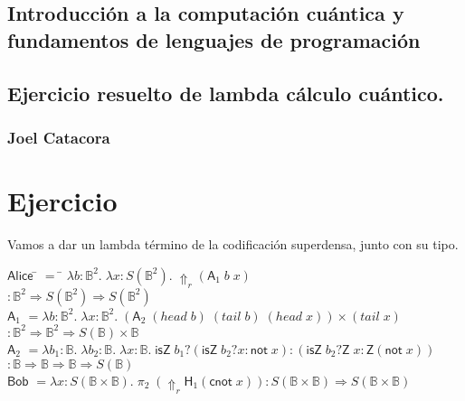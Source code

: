 \documentclass[a4paper,11pt]{article}
\title{}
\author{}
\begin{document}
\maketitle 

\thispagestyle{empty}
\begin{center}
\section*{Introducción a  la computación cuántica y fundamentos de lenguajes de programación} 
\subsection*{Ejercicio resuelto de lambda cálculo cuántico.}
\subsubsection*{Joel Catacora}

\end{center}

\newpage{\pagestyle{empty}\cleardoublepage}

\newpage

\section*
{Ejercicio}

Vamos a dar un lambda término de la codificación superdensa, junto con su tipo.

\begin{tabbing}
  $\textsf{Alice}$ \= $=$ \= $\lambda b : \mathds{B}^2. \; \lambda x : S(\mathds{B}^2). 
  \; \Uparrow_r (\textsf{A}_1 \; b \; x)$ \\
  
  \> \> $: \mathds{B}^2 \Rightarrow S(\mathds{B}^2) \Rightarrow S(\mathds{B}^2)$ \\

  $\textsf{A}_1$ \> $= \lambda b : \mathds{B}^2 . \; \lambda x : \mathds{B}^2. \; ( \textsf{A}_2 \; (head \; b) \; (tail \; b) \; (head \; x)) 
  \times (tail \; x)$ \\
  \> \> $: \mathds{B}^2 \Rightarrow \mathds{B}^2 \Rightarrow S(\mathds{B}) \times \mathds{B}$ \\
  
  $\textsf{A}_2$ \> $= \lambda b_1:\mathds{B}. \; \lambda b_2:\mathds{B}. \; \lambda x : \mathds{B}. \;
  \textsf{isZ} \; b_1 ? (\textsf{isZ} \; b_2 ? x : \textsf{not} \; x) : 
  (\textsf{isZ} \; b_2 ? \textsf{Z} \; x : \textsf{Z} (\textsf{not} \; x))$ \\
  \> \> $: \mathds{B} \Rightarrow \mathds{B} \Rightarrow \mathds{B} \Rightarrow S(\mathds{B})$ \\ 

  $\textsf{Bob}$ \> $= \lambda x : S(\mathds{B} \times \mathds{B}). \; \pi_{2} \; (\Uparrow_{r} \textsf{H}_{1} (\textsf{cnot} \; x)) 
  : S(\mathds{B} \times \mathds{B}) \Rightarrow S(\mathds{B} \times \mathds{B})$
\end{tabbing}
\end{document}
